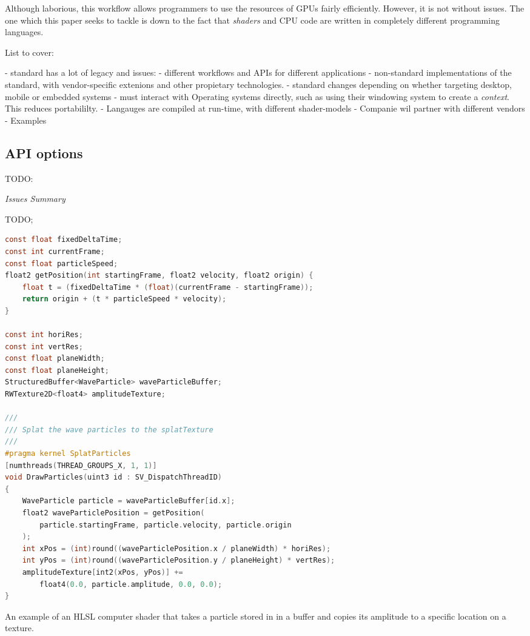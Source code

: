 \documentclass[a4paper,12pt,twoside,openright]{report}
\begin{document}
Although laborious, this workflow allows programmers to use the resources of
GPUs fairly efficiently. However, it is not without issues. The one which this
paper seeks to tackle is down to the fact that \textit{shaders} and CPU code
are written in completely different programming languages.

List to cover:

 - standard has a lot of legacy and issues:
    - different workflows and APIs for different applications
    - non-standard implementations of the standard, with vendor-specific extenions
    and other propietary technologies.
    - standard changes depending on whether targeting desktop, mobile or
    embedded systems
    - must interact with Operating systems directly, such as using their windowing
    system to create a \textit{context}. This reduces portabililty.
    - Langauges are compiled at run-time, with different shader-models
    - Companie wil partner with different vendors
    - Examples

\subsection{API options}

\label{sec:api_options}

TODO:


\textit{Issues Summary}

TODO;

\begin{lstfloat}
\begin{lstlisting}[language=C]
const float fixedDeltaTime;
const int currentFrame;
const float particleSpeed;
float2 getPosition(int startingFrame, float2 velocity, float2 origin) {
    float t = (fixedDeltaTime * (float)(currentFrame - startingFrame));
    return origin + (t * particleSpeed * velocity);
}

const int horiRes;
const int vertRes;
const float planeWidth;
const float planeHeight;
StructuredBuffer<WaveParticle> waveParticleBuffer;
RWTexture2D<float4> amplitudeTexture;

///
/// Splat the wave particles to the splatTexture
///
#pragma kernel SplatParticles
[numthreads(THREAD_GROUPS_X, 1, 1)]
void DrawParticles(uint3 id : SV_DispatchThreadID)
{
    WaveParticle particle = waveParticleBuffer[id.x];
    float2 waveParticlePosition = getPosition(
        particle.startingFrame, particle.velocity, particle.origin
    );
    int xPos = (int)round((waveParticlePosition.x / planeWidth) * horiRes);
    int yPos = (int)round((waveParticlePosition.y / planeHeight) * vertRes);
    amplitudeTexture[int2(xPos, yPos)] +=
        float4(0.0, particle.amplitude, 0.0, 0.0);
}
\end{lstlisting}
\label{lst:draw_particles}
\caption{An example of an HLSL computer shader that takes a particle stored in
in a buffer and copies its amplitude to a specific location on a texture.}
\end{lstfloat}
\end{document}
